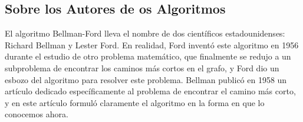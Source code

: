 \documentclass[a4paper, 10pt]{article}
\numberwithin{theoremCounter}{subsection}
\numberwithin{problemCounter}{subsection}
\numberwithin{defCounter}{subsection}
\numberwithin{obsCounter}{subsection}
\numberwithin{methCounter}{subsection}
\numberwithin{exampleCounter}{subsection}
\numberwithin{propCounter}{subsection}
\theoremstyle{violetnumbox}
\theoremstyle{blacknumex}
\begin{document}
\begin{multicols}{2}

\section{Sobre los Autores de os Algoritmos}
    El algoritmo Bellman-Ford lleva el nombre de dos científicos estadounidenses: Richard Bellman y Lester Ford. En realidad, Ford inventó este algoritmo en 1956 durante el estudio de otro problema matemático, que finalmente se redujo a un subproblema de encontrar los caminos más cortos en el grafo, y Ford dio un esbozo del algoritmo para resolver este problema. Bellman publicó en 1958 un artículo dedicado específicamente al problema de encontrar el camino más corto, y en este artículo formuló claramente el algoritmo en la forma en que lo conocemos ahora.

\end{multicols}
\end{document}
